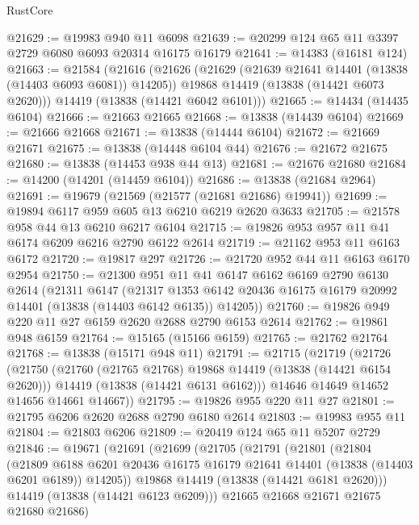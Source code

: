 \begin{lexlean}{RustCore}
\begin{coremodule}
@21629 := @19983 @940 @11 @6098
@21639 := @20299 @124 @65 @11 @3397 @2729 @6080 @6093 @20314 @16175 @16179
@21641 := @14383 (@16181 @124)
@21663 := @21584
    (@21616
      (@21626
        (@21629 (@21639 @21641 @14401 (@13838 (@14403 @6093 @6081)) @14205))
        @19868
        @14419
        (@13838 (@14421 @6073 @2620)))
      @14419
      (@13838 (@14421 @6042 @6101)))
@21665 := @14434 (@14435 @6104)
@21666 := @21663 @21665
@21668 := @13838 (@14439 @6104)
@21669 := @21666 @21668
@21671 := @13838 (@14444 @6104)
@21672 := @21669 @21671
@21675 := @13838 (@14448 @6104 @44)
@21676 := @21672 @21675
@21680 := @13838 (@14453 @938 @44 @13)
@21681 := @21676 @21680
@21684 := @14200 (@14201 (@14459 @6104))
@21686 := @13838 (@21684 @2964)
@21691 := @19679 (@21569 (@21577 (@21681 @21686) @19941))
@21699 := @19894 @6117 @959 @605 @13 @6210 @6219 @2620 @3633
@21705 := @21578 @958 @44 @13 @6210 @6217 @6104
@21715 := @19826 @953 @957 @11 @41 @6174 @6209 @6216 @2790 @6122 @2614
@21719 := @21162 @953 @11 @6163 @6172
@21720 := @19817 @297
@21726 := @21720 @952 @44 @11 @6163 @6170 @2954
@21750 := @21300
    @951
    @11
    @41
    @6147
    @6162
    @6169
    @2790
    @6130
    @2614
    (@21311
      @6147
      (@21317 @1353 @6142 @20436 @16175 @16179 @20992 @14401 (@13838 (@14403 @6142 @6135)) @14205))
@21760 := @19826 @949 @220 @11 @27 @6159 @2620 @2688 @2790 @6153 @2614
@21762 := @19861 @948 @6159
@21764 := @15165 (@15166 @6159)
@21765 := @21762 @21764
@21768 := @13838 (@15171 @948 @11)
@21791 := @21715
    (@21719
      (@21726
        (@21750
          (@21760 (@21765 @21768) @19868 @14419 (@13838 (@14421 @6154 @2620)))
          @14419
          (@13838 (@14421 @6131 @6162)))
        @14646
        @14649
        @14652
        @14656
        @14661
        @14667))
@21795 := @19826 @955 @220 @11 @27
@21801 := @21795 @6206 @2620 @2688 @2790 @6180 @2614
@21803 := @19983 @955 @11
@21804 := @21803 @6206
@21809 := @20419 @124 @65 @11 @5207 @2729
@21846 := @19671
    (@21691
      (@21699
        (@21705
          (@21791
            (@21801
              (@21804
                (@21809
                  @6188
                  @6201
                  @20436
                  @16175
                  @16179
                  @21641
                  @14401
                  (@13838 (@14403 @6201 @6189))
                  @14205))
              @19868
              @14419
              (@13838 (@14421 @6181 @2620)))
            @14419
            (@13838 (@14421 @6123 @6209)))
          @21665
          @21668
          @21671
          @21675
          @21680
          @21686)

\end{coremodule}
\end{lexlean}
